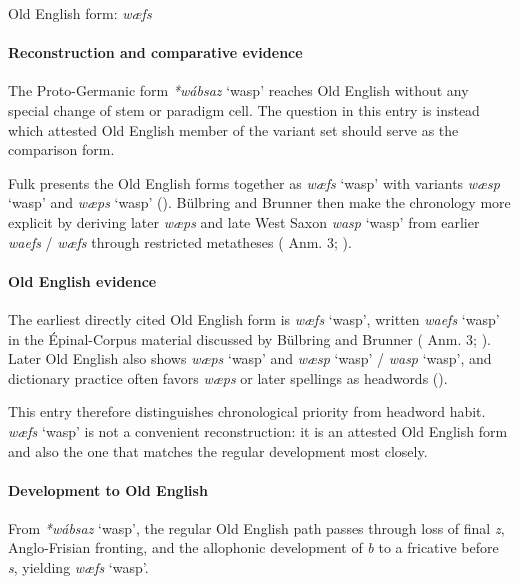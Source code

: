 \documentclass[
  british,
  a4paper,
]{article}
\providecommand{\Recon}[1]{\emph{*#1}}
\begin{document}
Old English form: \emph{wæfs}

\paragraph{Reconstruction and comparative
evidence}\label{reconstruction-and-comparative-evidence-89}

The Proto-Germanic form \Recon{wábsaz} `wasp' reaches Old English
without any special change of stem or paradigm cell. The question in
this entry is instead which attested Old English member of the variant
set should serve as the comparison form.

Fulk presents the Old English forms together as {\emph{wæfs}} `wasp'
with variants {\emph{wæsp}} `wasp' and {\emph{wæps}} `wasp'
(). Bülbring and Brunner
then make the chronology more explicit by deriving later \emph{wæps} and
late West Saxon {\emph{wasp}} `wasp' from earlier \emph{waefs} /
\emph{wæfs} through restricted metatheses
( Anm. 3;
).

\paragraph{Old English evidence}\label{old-english-evidence-91}

The earliest directly cited Old English form is {\emph{wæfs}} `wasp',
written {\emph{waefs}} `wasp' in the Épinal-Corpus material discussed by
Bülbring and Brunner ( Anm. 3; ). Later Old English also shows {\emph{wæps}} `wasp' and
{\emph{wæsp}} `wasp' / {\emph{wasp}} `wasp', and dictionary practice
often favors {\emph{wæps}} or later spellings as headwords
().

This entry therefore distinguishes chronological priority from headword
habit. {\emph{wæfs}} `wasp' is not a convenient reconstruction: it is an
attested Old English form and also the one that matches the regular
development most closely.

\paragraph{Development to Old
English}\label{development-to-old-english-89}

From \Recon{wábsaz} `wasp', the regular Old English path passes through
loss of final \emph{z}, Anglo-Frisian fronting, and the allophonic
development of \emph{b} to a fricative before \emph{s}, yielding
{\emph{wæfs}} `wasp'.
\end{document}
